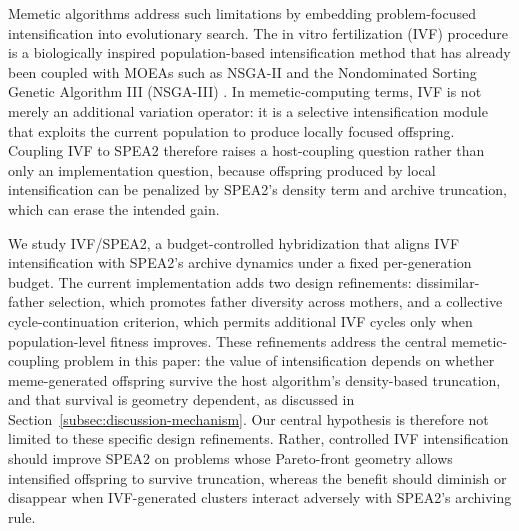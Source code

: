 \documentclass[pdflatex,sn-mathphys-ay]{sn-jnl}%
\theoremstyle{thmstyleone}%
\theoremstyle{thmstyletwo}%
\theoremstyle{thmstylethree}%
\begin{document}
Memetic algorithms address such limitations by embedding problem-focused intensification into evolutionary search. The in vitro fertilization (IVF) procedure is a biologically inspired population-based intensification method \citep{camilo-junior2011} that has already been coupled with MOEAs such as NSGA-II \citep{sampaio2017ivf} and the Nondominated Sorting Genetic Algorithm III (NSGA-III) \citep{Sampaio2024}. In memetic-computing terms, IVF is not merely an additional variation operator: it is a selective intensification module that exploits the current population to produce locally focused offspring. Coupling IVF to SPEA2 therefore raises a host-coupling question rather than only an implementation question, because offspring produced by local intensification can be penalized by SPEA2's density term and archive truncation, which can erase the intended gain.

We study IVF/SPEA2, a budget-controlled hybridization that aligns IVF intensification with SPEA2's archive dynamics under a fixed per-generation budget. The current implementation adds two design refinements: dissimilar-father selection, which promotes father diversity across mothers, and a collective cycle-continuation criterion, which permits additional IVF cycles only when population-level fitness improves. These refinements address the central memetic-coupling problem in this paper: the value of intensification depends on whether meme-generated offspring survive the host algorithm's density-based truncation, and that survival is geometry dependent, as discussed in Section~\ref{subsec:discussion-mechanism}. Our central hypothesis is therefore not limited to these specific design refinements. Rather, controlled IVF intensification should improve SPEA2 on problems whose Pareto-front geometry allows intensified offspring to survive truncation, whereas the benefit should diminish or disappear when IVF-generated clusters interact adversely with SPEA2's archiving rule.
\end{document}
